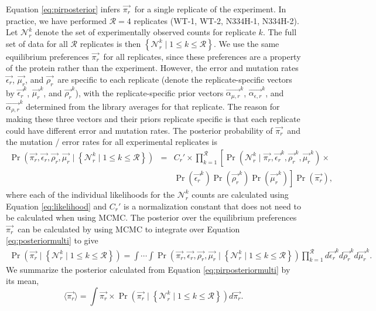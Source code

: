 \documentclass[12pt,draft]{article}
\newcommand{\ervec}{\mbox{$\overrightarrow{\epsilon_{r}}$}}
\newcommand{\rrvec}{\mbox{$\overrightarrow{\rho_{r}}$}}
\newcommand{\mrvec}{\mbox{$\overrightarrow{\mu_{r}}$}}
\newcommand{\pirvec}{\mbox{$\overrightarrow{\pi_r}$}}
\begin{document}
Equation \ref{eq:pirposterior} infers \pirvec\ for a single replicate of the experiment. In practice, we have performed $\mathcal{R} = 4$ replicates (WT-1, WT-2, N334H-1, N334H-2). Let $\mathcal{N}_r^k$ denote the set of experimentally observed counts for replicate $k$. The full set of data for all $\mathcal{R}$ replicates is then $\left\{\mathcal{N}_r^k\mid 1 \le k \le \mathcal{R} \right\}$. We use the same equilibrium preferences \pirvec\ for all replicates, since these preferences are a property of the protein rather than the experiment. However, the error and mutation rates \ervec, \mrvec, and \rrvec\ are specific to each replicate (denote the replicate-specific vectors by $\ervec^k$, $\mrvec^k$, and $\rrvec^k$),  with the replicate-specific prior vectors $\overrightarrow{\alpha_{\mu,r}}^k$, $\overrightarrow{\alpha_{\epsilon,r}}^k$, and $\overrightarrow{\alpha_{\rho,r}}^k$ determined from the library averages for that replicate. The reason for making these three vectors and their priors replicate specific is that each replicate could have different error and mutation rates. The posterior probability of \pirvec\ and the mutation / error rates for all experimental replicates is
\begin{eqnarray}
\label{eq:posteriormulti}
 \Pr\left(\pirvec, \ervec, \rrvec, \mrvec \mid \left\{\mathcal{N}_r^k \mid 1 \le k \le \mathcal{R}\right\} \right) &=& 
C_r' \times  \prod\limits_{k=1}^{\mathcal{R}} \left[ \Pr\left(\mathcal{N}_r^k \mid \pirvec, \ervec^k, \rrvec^k, \mrvec^k \right) \times \right. \nonumber \\ && \left. \Pr\left(\ervec^k\right) \Pr\left(\rrvec^k\right) \Pr\left(\mrvec^k\right)\right] \Pr\left(\pirvec\right),
\end{eqnarray}
where each of the individual likelihoods for the $\mathcal{N}_r^k$ counts are calculated using Equation \ref{eq:likelihood} and $C_r'$ is a normalization constant that does not need to be calculated when using MCMC. The posterior over the equilibrium preferences \pirvec\ can be calculated by using MCMC to integrate over Equation \ref{eq:posteriormulti} to give
\begin{eqnarray}
\label{eq:pirposteriormulti}
\Pr\left(\pirvec \mid \left\{\mathcal{N}_r^k \mid 1 \le k \le \mathcal{R}\right\} \right) = \int \cdots \int \Pr\left(\pirvec, \ervec, \rrvec, \mrvec \mid \left\{\mathcal{N}_r^k \mid 1 \le k \le \mathcal{R}\right\} \right) \prod\limits_{k=1}^{\mathcal{R}} d\ervec^k d\rrvec^k d\mrvec^k.
\end{eqnarray}
We summarize the posterior calculated from Equation \ref{eq:pirposteriormulti} by its mean, 
\begin{equation}
\label{eq:meanpir}
\langle \pirvec \rangle = \int \pirvec \times \Pr\left(\pirvec \mid \left\{\mathcal{N}_r^k \mid 1 \le k \le \mathcal{R}\right\} \right) d\pirvec.
\end{equation}




\end{document}
